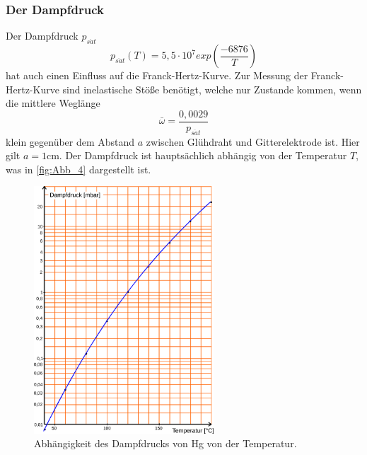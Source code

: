 \subsubsection{Der Dampfdruck}
\label{subsubsec:Dampfdruck}
Der Dampfdruck $p_{s\ddot{a}t}$
\begin{equation}
    p_{s\ddot{a}t}(T) = 5,5 \cdot 10^7 exp(\frac{-6876}{T})
    \label{eqn:psät}
\end{equation}
hat auch einen Einfluss auf die Franck-Hertz-Kurve. Zur Messung der Franck-Hertz-Kurve sind inelastische Stöße benötigt,
welche nur Zustande kommen, wenn die mittlere Weglänge
\begin{equation}
    \bar{\omega} = \frac{0,0029}{p_{s\ddot{a}t}}
    \label{eqn:Weglänge}
\end{equation}
klein gegenüber dem Abstand $a$ zwischen Glühdraht und Gitterelektrode ist. Hier gilt $a = 1 \si{\centi\meter}$.
Der Dampfdruck ist hauptsächlich abhängig von der Temperatur $T$, was in \autoref{fig:Abb_4} dargestellt ist.
\begin{figure}[H]
    \centering
    \includegraphics[width=0.6\textwidth]{build/Abb_4.png}
    \caption{Abhängigkeit des Dampfdrucks von Hg von der Temperatur\cite{V601}.}
    \label{fig:Abb_4}
\end{figure}
